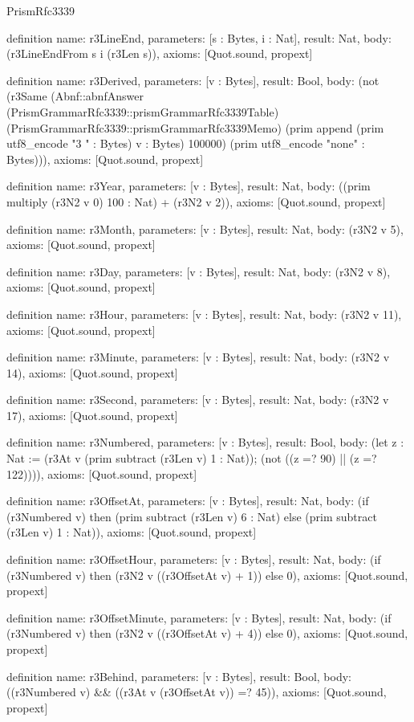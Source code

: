 \begin{lexlean}{PrismRfc3339}
\begin{semanticmodule}
definition{
  name: r3LineEnd,
  parameters: [s : Bytes, i : Nat],
  result: Nat,
  body: (r3LineEndFrom s i (r3Len s)),
  axioms: [Quot.sound, propext]
}

definition{
  name: r3Derived,
  parameters: [v : Bytes],
  result: Bool,
  body: (not (r3Same (Abnf::abnfAnswer (PrismGrammarRfc3339::prismGrammarRfc3339Table) (PrismGrammarRfc3339::prismGrammarRfc3339Memo) (prim append (prim utf8_encode "3 " : Bytes) v : Bytes) 100000) (prim utf8_encode "none" : Bytes))),
  axioms: [Quot.sound, propext]
}

definition{
  name: r3Year,
  parameters: [v : Bytes],
  result: Nat,
  body: ((prim multiply (r3N2 v 0) 100 : Nat) + (r3N2 v 2)),
  axioms: [Quot.sound, propext]
}

definition{
  name: r3Month,
  parameters: [v : Bytes],
  result: Nat,
  body: (r3N2 v 5),
  axioms: [Quot.sound, propext]
}

definition{
  name: r3Day,
  parameters: [v : Bytes],
  result: Nat,
  body: (r3N2 v 8),
  axioms: [Quot.sound, propext]
}

definition{
  name: r3Hour,
  parameters: [v : Bytes],
  result: Nat,
  body: (r3N2 v 11),
  axioms: [Quot.sound, propext]
}

definition{
  name: r3Minute,
  parameters: [v : Bytes],
  result: Nat,
  body: (r3N2 v 14),
  axioms: [Quot.sound, propext]
}

definition{
  name: r3Second,
  parameters: [v : Bytes],
  result: Nat,
  body: (r3N2 v 17),
  axioms: [Quot.sound, propext]
}

definition{
  name: r3Numbered,
  parameters: [v : Bytes],
  result: Bool,
  body: (let z : Nat := (r3At v (prim subtract (r3Len v) 1 : Nat)); (not ((z =? 90) || (z =? 122)))),
  axioms: [Quot.sound, propext]
}

definition{
  name: r3OffsetAt,
  parameters: [v : Bytes],
  result: Nat,
  body: (if (r3Numbered v) then (prim subtract (r3Len v) 6 : Nat) else (prim subtract (r3Len v) 1 : Nat)),
  axioms: [Quot.sound, propext]
}

definition{
  name: r3OffsetHour,
  parameters: [v : Bytes],
  result: Nat,
  body: (if (r3Numbered v) then (r3N2 v ((r3OffsetAt v) + 1)) else 0),
  axioms: [Quot.sound, propext]
}

definition{
  name: r3OffsetMinute,
  parameters: [v : Bytes],
  result: Nat,
  body: (if (r3Numbered v) then (r3N2 v ((r3OffsetAt v) + 4)) else 0),
  axioms: [Quot.sound, propext]
}

definition{
  name: r3Behind,
  parameters: [v : Bytes],
  result: Bool,
  body: ((r3Numbered v) && ((r3At v (r3OffsetAt v)) =? 45)),
  axioms: [Quot.sound, propext]
}


\end{semanticmodule}
\end{lexlean}
